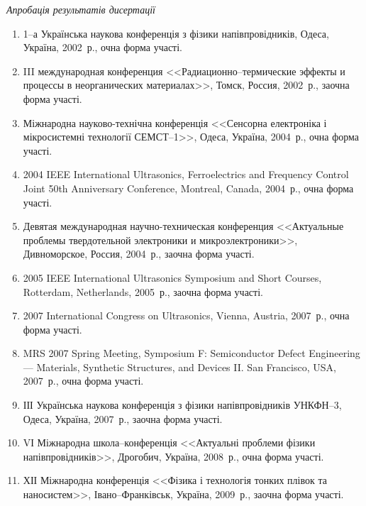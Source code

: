 \begin{center}%
\emph{Апробація результатів дисертації}
\end{center}%
\begin{enumerate}[label=\arabic*.,leftmargin=1em,itemindent=1em]

\item
1--а Українська наукова конференція з фізики напівпровідників, Одеса, Україна, 2002~р., очна форма участі.

\item
III международная конференция <<Радиационно--термические эффекты и процессы в неорганических материалах>>, Томск, Россия, 2002~р., заочна форма участі.

\item
Міжнародна науково-технічна конференція <<Сенсорна електроніка і мікросистемні технології СЕМСТ--1>>, Одеса, Україна, 2004~р., очна форма участі.

\item
2004 IEEE International Ultrasonics, Ferroelectrics and Frequency Control Joint 50th Anniversary Conference, Montreal, Canada, 2004~р., очна форма участі.

\item
Девятая международная научно-техническая конференция <<Актуальные проблемы твердотельной электроники и микроэлектроники>>, Дивноморское, Россия, 2004~р., заочна форма участі.

\item
2005 IEEE International Ultrasonics Symposium and Short Courses, Rotterdam, Netherlands, 2005~р., заочна форма участі.

\item
2007 International Congress on Ultrasonics, Vienna, Austria, 2007~р., очна форма участі.

\item
MRS 2007 Spring Meeting, Symposium F: Semiconductor Defect Engineering --- Materials, Synthetic Structures, and Devices II. San Francisco, USA, 2007~р., очна форма участі.

\item
ІІІ Українська наукова конференція з фізики напівпровідників УНКФН--3, Одеса, Україна, 2007~р., заочна форма участі.

\item
VІ Міжнародна школа--конференція <<Актуальні проблеми фізики напівпровідників>>, Дрогобич, Україна, 2008~р., очна форма участі.

\item
ХІІ Міжнародна конференція <<Фізика і технологія тонких плівок та наносистем>>, Івано--Франківськ, Україна, 2009~р., заочна форма участі.


\end{enumerate}
